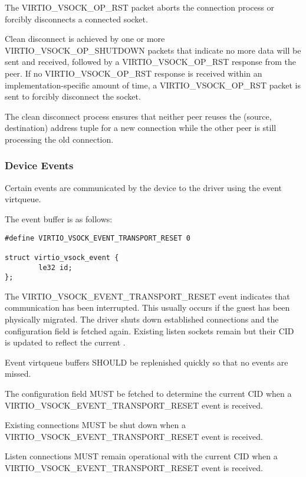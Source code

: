 The VIRTIO_VSOCK_OP_RST packet aborts the connection process or forcibly
disconnects a connected socket.

Clean disconnect is achieved by one or more VIRTIO_VSOCK_OP_SHUTDOWN packets
that indicate no more data will be sent and received, followed by a
VIRTIO_VSOCK_OP_RST response from the peer.  If no VIRTIO_VSOCK_OP_RST response
is received within an implementation-specific amount of time, a
VIRTIO_VSOCK_OP_RST packet is sent to forcibly disconnect the socket.

The clean disconnect process ensures that neither peer reuses the (source,
destination) address tuple for a new connection while the other peer is still
processing the old connection.

\subsubsection{Device Events}\label{sec:Device Types / Socket Device / Device Operation / Device Events}

Certain events are communicated by the device to the driver using the event
virtqueue.

The event buffer is as follows:

\begin{lstlisting}
#define VIRTIO_VSOCK_EVENT_TRANSPORT_RESET 0

struct virtio_vsock_event {
        le32 id;
};
\end{lstlisting}

The VIRTIO_VSOCK_EVENT_TRANSPORT_RESET event indicates that communication has
been interrupted.  This usually occurs if the guest has been physically
migrated.  The driver shuts down established connections and the
 configuration field is fetched again.  Existing listen
sockets remain but their CID is updated to reflect the current
.


Event virtqueue buffers SHOULD be replenished quickly so that no events are
missed.

The  configuration field MUST be fetched to determine the
current CID when a VIRTIO_VSOCK_EVENT_TRANSPORT_RESET event is received.

Existing connections MUST be shut down when a
VIRTIO_VSOCK_EVENT_TRANSPORT_RESET event is received.

Listen connections MUST remain operational with the current CID when a
VIRTIO_VSOCK_EVENT_TRANSPORT_RESET event is received.
